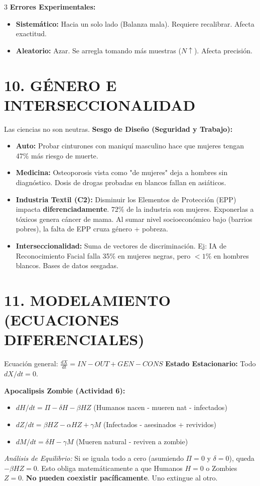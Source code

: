\documentclass[11pt,landscape,letterpaper]{extarticle}
\begin{document}
\begin{multicols*}{3}
	\textbf{Errores Experimentales:}
	\begin{itemize}
		\item \textbf{Sistemático:} Hacia un solo lado (Balanza mala). Requiere recalibrar. Afecta exactitud.
		\item \textbf{Aleatorio:} Azar. Se arregla tomando más muestras ($N \uparrow$). Afecta precisión.
	\end{itemize}

	\section{10. GÉNERO E INTERSECCIONALIDAD}
	Las ciencias no son neutras.
	\textbf{Sesgo de Diseño (Seguridad y Trabajo):}
	\begin{itemize}
		\item \textbf{Auto:} Probar cinturones con maniquí masculino hace que mujeres tengan 47\% más riesgo de muerte.
		\item \textbf{Medicina:} Osteoporosis vista como "de mujeres" deja a hombres sin diagnóstico. Dosis de drogas probadas en blancos fallan en asiáticos.
		\item \textbf{Industria Textil (C2):} Disminuir los Elementos de Protección (EPP) impacta \textbf{diferenciadamente}. 72\% de la industria son mujeres. Exponerlas a tóxicos genera cáncer de mama. Al sumar nivel socioeconómico bajo (barrios pobres), la falta de EPP cruza género + pobreza.
		\item \textbf{Interseccionalidad:} Suma de vectores de discriminación. Ej: IA de Reconocimiento Facial falla 35\% en mujeres negras, pero $<1\%$ en hombres blancos. Bases de datos sesgadas.
	\end{itemize}

	\section{11. MODELAMIENTO (ECUACIONES DIFERENCIALES)}
	Ecuación general: $ \frac{dX}{dt} = IN - OUT + GEN - CONS $
	\textbf{Estado Estacionario:} Todo $dX/dt = 0$.

	\textbf{Apocalipsis Zombie (Actividad 6):}
	\begin{itemize}
		\item $dH/dt = \Pi - \delta H - \beta H Z$ (Humanos nacen - mueren nat - infectados)
		\item $dZ/dt = \beta H Z - \alpha H Z + \gamma M$ (Infectados - asesinados + revividos)
		\item $dM/dt = \delta H - \gamma M$ (Mueren natural - reviven a zombie)
	\end{itemize}
	\textit{Análisis de Equilibrio:} Si se iguala todo a cero (asumiendo $\Pi=0$ y $\delta=0$), queda $-\beta H Z = 0$. Esto obliga matemáticamente a que Humanos $H=0$ o Zombies $Z=0$. \textbf{No pueden coexistir pacíficamente}. Uno extingue al otro.


\end{multicols*}
\end{document}
